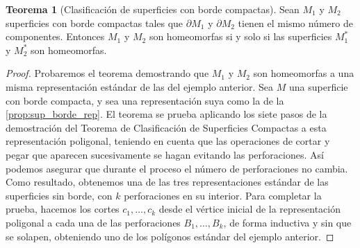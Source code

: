\documentclass[10pt]{report}
\theoremstyle{definition}
\newtheorem{tma}[defin]{Teorema}
\begin{document}
\begin{tma}[Clasificación de superficies con borde compactas]
Sean $M_1$ y $M_2$ superficies con borde compactas tales que $\partial M_1$ y $\partial M_2$ tienen el mismo número de componentes. Entonces $M_1$ y $M_2$ son homeomorfas si y solo si las superficies $M_1^*$ y $M_2^*$  son homeomorfas.
\end{tma}
\begin{proof}
Probaremos el teorema demostrando que $M_1$ y $M_2$ son homeomorfas a una misma representación estándar de las del ejemplo anterior.
Sea $M$ una superficie con borde compacta, y sea una representación suya como la de la \autoref{prop:sup_borde_rep}. El teorema se prueba aplicando los siete pasos de la demostración del Teorema de Clasificación de Superficies Compactas a esta representación poligonal, teniendo en cuenta que las operaciones de cortar y pegar que aparecen sucesivamente se hagan evitando las perforaciones. Así podemos asegurar que durante el proceso el número de perforaciones no cambia. Como resultado, obtenemos una de las tres representaciones estándar de las superficies sin borde, con $k$ perforaciones en su interior. Para completar la prueba, hacemos los cortes $c_1,\dots ,c_k$ desde el vértice inicial de la representación poligonal a cada una de las perforaciones $B_1,\dots ,B_k$, de forma inductiva y sin que se solapen, obteniendo uno de los polígonos estándar del ejemplo anterior.
\end{proof}
\end{document}
